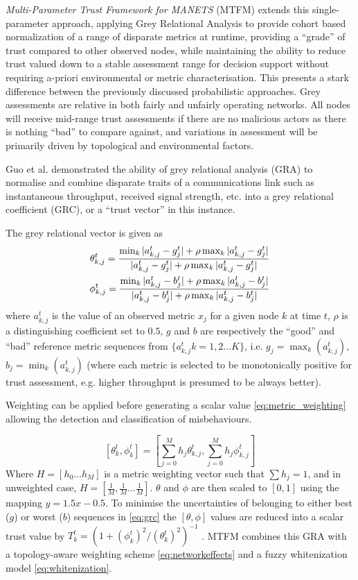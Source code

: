 \documentclass{aamas2016}
\begin{document}
\textit{Multi-Parameter Trust Framework for MANETS} (MTFM) extends this single-parameter approach, applying Grey Relational Analysis \cite{Zuo1995} to provide cohort based normalization of a range of disparate metrics at runtime, providing a ``grade'' of trust compared to other observed nodes, while maintaining the ability to reduce trust valued down to a stable assessment range for decision support without requiring a-priori environmental or metric characterisation. This presents a stark difference between the previously discussed probabilistic approaches. Grey assessments are relative in both fairly and unfairly operating networks. All nodes will receive mid-range trust assessments if there are no malicious actors as there is nothing ``bad'' to compare against, and variations in assessment will be primarily driven by topological and environmental factors.

Guo et al. \cite{Guo11} demonstrated the ability of grey relational analysis (GRA) \cite{Zuo1995} to normalise and combine disparate traits of a communications link such as instantaneous throughput, received signal strength, etc. into a grey relational coefficient (GRC), or a ``trust vector'' in this instance.

The grey relational vector is given as
%
\begin{align}
\label{eq:grc}
\theta_{k,j}^t = \frac{\min_k|a_{k,j}^t - g_j^t| + \rho \max_k|a_{k,j}^t-g_j^t|}{|a_{k,j}^t-g_j^t| + \rho \max_k|a_{k,j}^t-g_j^t|} \\
\phi_{k,j}^t = \frac{\min_k|a_{k,j}^t - b_j^t| + \rho \max_k|a_{k,j}^t-b_j^t|}{|a_{k,j}^t-b_j^t| + \rho \max_k|a_{k,j}^t-b_j^t|} \notag 
\end{align}
%
where $a_{k,j}^t$ is the value of an observed metric $x_j$ for a given node $k$ at time $t$, $\rho$ is a distinguishing coefficient set to $0.5$, $g$ and $b$ are respectively the ``good'' and ``bad'' reference metric sequences from $\{a_{k,j}^t k=1,2\dots K\}$, i.e. $g_j=\max_k({a_{k,j}^t})$,  $b_j=\min_k({a_{k,j}^t})$ (where each metric is selected to be monotonically positive for trust assessment, e.g. higher throughput is presumed to be always better). 

Weighting can be applied before generating a scalar value \eqref{eq:metric_weighting} allowing the detection and classification of misbehaviours.

%
\begin{equation}
\label{eq:metric_weighting}
[\theta_k^t, \phi_k^t] = \left[\sum_{j=0}^M h_j \theta_{k,j}^t,\sum_{j=0}^M h_j \phi_{k,j}^t \right]
\end{equation}
%
Where $H=[h_0\dots h_M]$ is a metric weighting vector such that $\sum h_j = 1$, and in unweighted case, $H=[\frac{1}{M},\frac{1}{M}\dots\frac{1}{M}]$.
$\theta$ and $\phi$ are then scaled to $[0,1]$ using the mapping $y = 1.5 x - 0.5$.
To minimise the uncertainties of belonging to either best ($g$) or worst ($b$) sequences in \eqref{eq:grc} the $[\theta,\phi]$ values are reduced into a scalar trust value by $T_k^t = ({1+{(\phi_k^t)^2}/{(\theta_k^t)^2}})^{-1}$ \cite{Hong2010}.
MTFM combines this GRA with a topology-aware weighting scheme \eqref{eq:networkeffects} and a fuzzy whitenization model \eqref{eq:whitenization}. 
\end{document}
